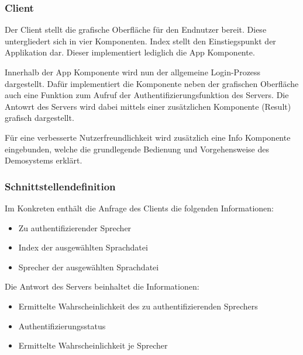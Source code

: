 \subsubsection{Client}
Der Client stellt die grafische Oberfläche für den Endnutzer bereit.
Diese untergliedert sich in vier Komponenten.
Index stellt den Einstiegspunkt der Applikation dar.
Dieser implementiert lediglich die App Komponente.

Innerhalb der App Komponente wird nun der allgemeine Login-Prozess dargestellt.
Dafür implementiert die Komponente neben der grafischen Oberfläche auch eine Funktion zum Aufruf der Authentifizierungsfunktion des Servers.
Die Antowrt des Servers wird dabei mittels einer zusätzlichen Komponente (Result) grafisch dargestellt.

Für eine verbesserte Nutzerfreundlichkeit wird zusätzlich eine Info Komponente eingebunden, welche die grundlegende Bedienung und Vorgehensweise des Demosystems erklärt.

\subsubsection{Schnittstellendefinition}
Im Konkreten enthält die Anfrage des Clients die folgenden Informationen:
\begin{itemize}
    \item Zu authentifizierender Sprecher
    \item Index der ausgewählten Sprachdatei
    \item Sprecher der ausgewählten Sprachdatei
\end{itemize}
Die Antwort des Servers beinhaltet die Informationen:
\begin{itemize}
    \item Ermittelte Wahrscheinlichkeit des zu authentifizierenden Sprechers
    \item Authentifizierungsstatus
    \item Ermittelte Wahrscheinlichkeit je Sprecher
\end{itemize}